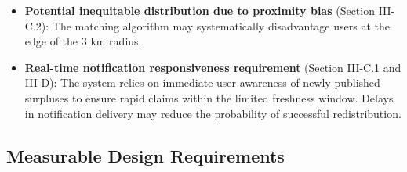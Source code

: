 \documentclass[12pt]{article}
\begin{document}
\begin{itemize}
    \item \textbf{Potential inequitable distribution due to proximity bias} (Section III-C.2): The matching algorithm may systematically disadvantage users at the edge of the 3 km radius.

    \item \textbf{Real-time notification responsiveness requirement} (Section III-C.1 and III-D): The system relies on immediate user awareness of newly published surpluses to ensure rapid claims within the limited freshness window. Delays in notification delivery may reduce the probability of successful redistribution.
\end{itemize}

\subsection{Measurable Design Requirements}
\end{document}
